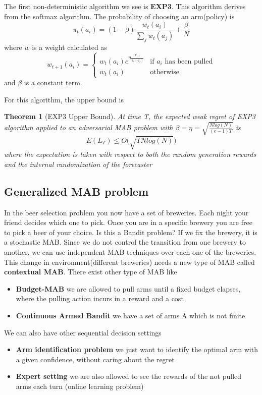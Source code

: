 \documentclass[main.tex]{subfiles}
\newtheorem{theorem}{Theorem}[section]
\begin{document}
The first non-deterministic algorithm we see is \textbf{EXP3}.
This algorithm derives from the softmax algorithm.
The probability of choosing an arm(policy) is
\begin{equation}
    \pi_t(a_i) = (1-\beta) \frac{w_t(a_i)}{\sum_j w_t(a_j)} + \frac{\beta}{N}
\end{equation}
where $w$ is a weight calculated as
\begin{equation*}
    w_{t+1}(a_i) =
    \begin{cases}
        w_t(a_i)e^{\eta \frac{r_{i,t}}{\pi_t(a_i)}} & \text{if $a_i$ has been pulled} \\
        w_t(a_i)                                    & \text{otherwise}
    \end{cases}
\end{equation*}
and $\beta$ is a constant term.
\par \noindent
For this algorithm, the upper bound is
\begin{theorem}[EXP3 Upper Bound]
    At time T, the expected weak regret of EXP3 algorithm applied to an adversarial MAB problem with $\beta = \eta = \sqrt{\frac{Nlog(N)}{(e-1)T}}$ is
    \begin{equation*}
        E(L_T) \leq O\big( \sqrt{TNlog(N)} \big)
    \end{equation*}
    where the expectation is taken with respect to both the random generation rewards and the internal randomization of the forecaster
\end{theorem}

\subsection{Generalized MAB problem}
In the beer selection problem you now have a set of breweries. Each night your friend decides which one to pick. Once you are in a specific brewery you are free to pick a beer of your choice.
Is this a Bandit problem?
If we fix the brewery, it is a stochastic MAB. Since we do not control the transition from one brewery to another, we can use independent MAB techniques over each one of the breweries. This change in environment(different breweries) needs a new type of MAB called \textbf{contextual MAB}. There exist other type of MAB like
\begin{itemize}
    \item \textbf{Budget-MAB} we are allowed to pull arms until a fixed budget elapses, where the pulling action incurs in a reward and a cost
    \item \textbf{Continuous Armed Bandit} we have a set of arms A which is not finite
\end{itemize}
We can also have other sequential decision settings
\begin{itemize}
    \item \textbf{Arm identification problem} we just want to identify the optimal arm with a given confidence, without caring about the regret
    \item \textbf{Expert setting} we are also allowed to see the rewards of the not pulled arms each turn (online learning problem)
\end{itemize}
\end{document}
